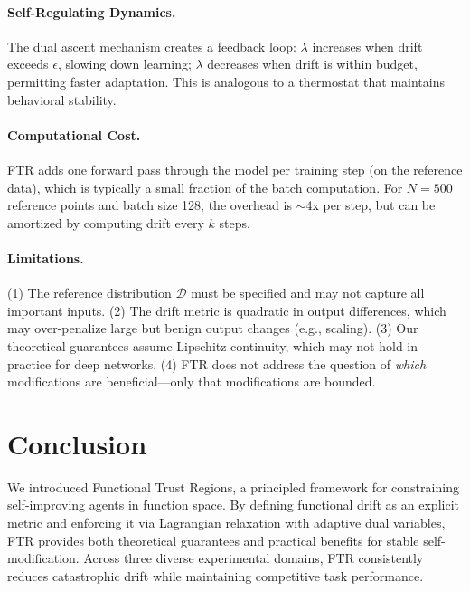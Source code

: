 \documentclass{article}
\newcommand{\calD}{\mathcal{D}}
\begin{document}
\paragraph{Self-Regulating Dynamics.}
The dual ascent mechanism creates a feedback loop: $\lambda$ increases when drift exceeds $\epsilon$, slowing down learning; $\lambda$ decreases when drift is within budget, permitting faster adaptation. This is analogous to a thermostat that maintains behavioral stability.

\paragraph{Computational Cost.}
FTR adds one forward pass through the model per training step (on the reference data), which is typically a small fraction of the batch computation. For $N=500$ reference points and batch size 128, the overhead is $\sim$4x per step, but can be amortized by computing drift every $k$ steps.

\paragraph{Limitations.}
(1) The reference distribution $\calD$ must be specified and may not capture all important inputs. (2) The drift metric is quadratic in output differences, which may over-penalize large but benign output changes (e.g., scaling). (3) Our theoretical guarantees assume Lipschitz continuity, which may not hold in practice for deep networks. (4) FTR does not address the question of \emph{which} modifications are beneficial—only that modifications are bounded.


\section{Conclusion}

We introduced Functional Trust Regions, a principled framework for constraining self-improving agents in function space. By defining functional drift as an explicit metric and enforcing it via Lagrangian relaxation with adaptive dual variables, FTR provides both theoretical guarantees and practical benefits for stable self-modification. Across three diverse experimental domains, FTR consistently reduces catastrophic drift while maintaining competitive task performance.
\end{document}
